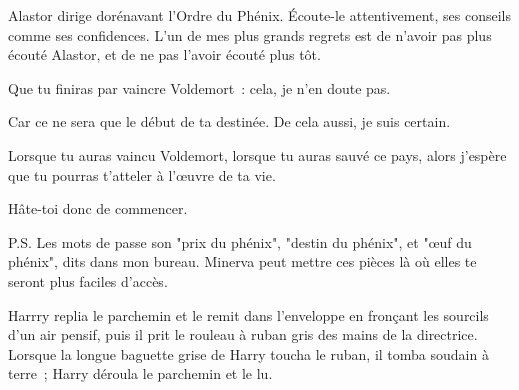\begin{writtenNote}
Alastor dirige dorénavant l'Ordre du Phénix. Écoute-le attentivement, ses conseils comme ses confidences. L'un de mes plus grands regrets est de n'avoir pas plus écouté Alastor, et de ne pas l'avoir écouté plus tôt.

Que tu finiras par vaincre Voldemort~: cela, je n'en doute pas.

Car ce ne sera que le début de ta destinée. De cela aussi, je suis certain.

Lorsque tu auras vaincu Voldemort, lorsque tu auras sauvé ce pays, alors j'espère que tu pourras t'atteler à l'œuvre de ta vie.

Hâte-toi donc de commencer.


P.S. Les mots de passe son "prix du phénix", "destin du phénix", et "œuf du phénix", dits dans mon bureau. Minerva peut mettre ces pièces là où elles te seront plus faciles d'accès.
\end{writtenNote}

\later

Harrry replia le parchemin et le remit dans l'enveloppe en fronçant les sourcils d'un air pensif, puis il prit le rouleau à ruban gris des mains de la directrice. Lorsque la longue baguette grise de Harry toucha le ruban, il tomba soudain à terre~; Harry déroula le parchemin et le lu.

